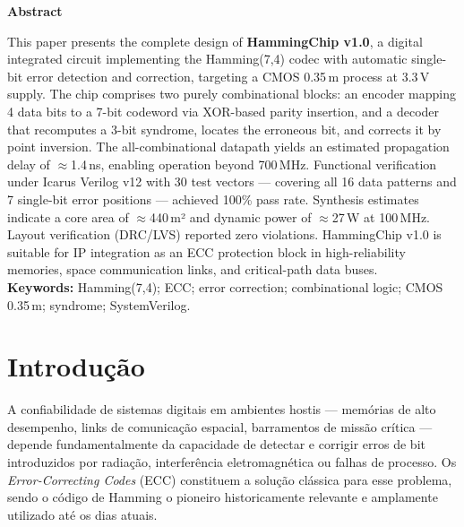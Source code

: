 \documentclass[12pt,a4paper]{article}
\begin{document}
\vspace{6pt}
\begin{center}
  {\large\bfseries\color{hammingblue} Abstract}
\end{center}
\begin{unidadebox}[Abstract]
This paper presents the complete design of \textbf{HammingChip v1.0}, a digital integrated circuit implementing the Hamming(7,4) codec with automatic single-bit error detection and correction, targeting a CMOS 0.35\,\textmu m process at 3.3\,V supply. The chip comprises two purely combinational blocks: an encoder mapping 4 data bits to a 7-bit codeword via XOR-based parity insertion, and a decoder that recomputes a 3-bit syndrome, locates the erroneous bit, and corrects it by point inversion. The all-combinational datapath yields an estimated propagation delay of $\approx$1.4\,ns, enabling operation beyond 700\,MHz. Functional verification under Icarus Verilog v12 with 30 test vectors — covering all 16 data patterns and 7 single-bit error positions — achieved 100\% pass rate. Synthesis estimates indicate a core area of $\approx$440\,\textmu m² and dynamic power of $\approx$27\,\textmu W at 100\,MHz. Layout verification (DRC/LVS) reported zero violations. HammingChip v1.0 is suitable for IP integration as an ECC protection block in high-reliability memories, space communication links, and critical-path data buses.\\[4pt]
\textbf{Keywords:} Hamming(7,4); ECC; error correction; combinational logic; CMOS 0.35\,\textmu m; syndrome; SystemVerilog.
\end{unidadebox}

\newpage
\tableofcontents
\listoffigures
\listoftables
\newpage

\section{Introdução}

A confiabilidade de sistemas digitais em ambientes hostis --- memórias de alto desempenho, links de comunicação espacial, barramentos de missão crítica --- depende fundamentalmente da capacidade de detectar e corrigir erros de bit introduzidos por radiação, interferência eletromagnética ou falhas de processo. Os \textit{Error-Correcting Codes} (ECC) constituem a solução clássica para esse problema, sendo o código de Hamming o pioneiro historicamente relevante e amplamente utilizado até os dias atuais.
\end{document}
